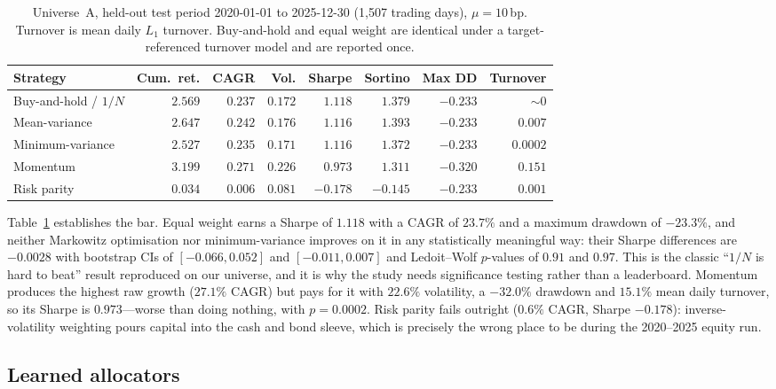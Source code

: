 \documentclass[11pt]{article}
\begin{document}
\begin{table}[t]
\centering
\caption{Universe~A, held-out test period 2020-01-01 to 2025-12-30 (1{,}507 trading days),
$\mu = 10$\,bp. Turnover is mean daily $L_1$ turnover. Buy-and-hold and equal weight are
identical under a target-referenced turnover model and are reported once.}
\label{tab:classical}
\small
\begin{tabular}{lrrrrrrr}
\toprule
Strategy & Cum.\ ret. & CAGR & Vol. & \textbf{Sharpe} & Sortino & Max DD & Turnover \\
\midrule
Buy-and-hold / $1/N$ & $2.569$ & $0.237$ & $0.172$ & $\mathbf{1.118}$ & $1.379$ & $-0.233$ & ${\sim}0$ \\
Mean-variance        & $2.647$ & $0.242$ & $0.176$ & $1.116$ & $1.393$ & $-0.233$ & $0.007$ \\
Minimum-variance     & $2.527$ & $0.235$ & $0.171$ & $1.116$ & $1.372$ & $-0.233$ & $0.0002$ \\
Momentum             & $3.199$ & $\mathbf{0.271}$ & $0.226$ & $0.973$ & $1.311$ & $-0.320$ & $0.151$ \\
Risk parity          & $0.034$ & $0.006$ & $0.081$ & $-0.178$ & $-0.145$ & $-0.233$ & $0.001$ \\
\bottomrule
\end{tabular}
\end{table}

Table~\ref{tab:classical} establishes the bar. Equal weight earns a Sharpe of $1.118$ with a
CAGR of $23.7\%$ and a maximum drawdown of $-23.3\%$, and neither Markowitz optimisation nor
minimum-variance improves on it in any statistically meaningful way: their Sharpe differences
are $-0.0028$ with bootstrap CIs of $[-0.066, 0.052]$ and $[-0.011, 0.007]$ and Ledoit--Wolf
$p$-values of $0.91$ and $0.97$. This is the classic ``$1/N$ is hard to beat'' result
\cite{demiguel2009optimal} reproduced on our universe, and it is why the study needs
significance testing rather than a leaderboard. Momentum produces the highest raw growth
($27.1\%$ CAGR) but pays for it with $22.6\%$ volatility, a $-32.0\%$ drawdown and $15.1\%$
mean daily turnover, so its Sharpe is $0.973$---worse than doing nothing, with $p = 0.0002$.
Risk parity fails outright ($0.6\%$ CAGR, Sharpe $-0.178$): inverse-volatility weighting pours
capital into the cash and bond sleeve, which is precisely the wrong place to be during the
2020--2025 equity run.

\subsection{Learned allocators}
\label{sec:learned-hold}
\end{document}
